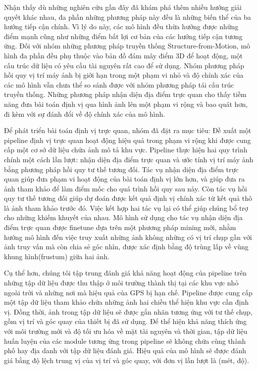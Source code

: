 Nhận thấy dù những nghiên cứu gần đây đã khám phá thêm nhiều hướng giải quyết khác nhau, đa phần những phương pháp này đều là những biến thể của ba hướng tiếp cận chính. Vì lý do này, các mô hình đều thừa hưởng được những điểm mạnh cũng như những điểm bất lợi cơ bản của các hướng tiếp cận tương ứng. Đối với nhóm những phương pháp truyền thống Structure-from-Motion, mô hình đa phần đều phụ thuộc vào bản đồ đám mây điểm 3D để hoạt động, một cấu trúc dữ liệu có yêu cầu tài nguyên rất cao để sử dụng. Nhóm phương pháp hồi quy vị trí máy ảnh bị giới hạn trong một phạm vi nhỏ và độ chính xác của các mô hình vẫn chưa thể so sánh được với nhóm phương pháp tái cấu trúc truyền thống. Những phương pháp nhận diện địa điểm trực quan cho thấy tiềm năng đưa bài toán định vị qua hình ảnh lên một phạm vi rộng và bao quát hơn, đi kèm với sự đánh đổi về độ chính xác của mô hình.

Để phát triển bài toán định vị trực quan, nhóm đã đặt ra mục tiêu: Đề xuất một pipeline định vị trực quan hoạt động hiệu quả trong phạm vi rộng khi được cung cấp một cơ sở dữ liệu chứa ảnh mô tả khu vực. Pipeline thực hiện hai quy trình chính một cách lần lượt: nhận diện địa điểm trực quan và ước tính vị trí máy ảnh bằng phương pháp hồi quy tư thế tương đối. Tác vụ nhận diện địa điểm trực quan giúp đưa phạm vi hoạt động của bài toán định vị lớn hơn, và giúp đưa ra ảnh tham khảo để làm điểm mốc cho quá trình hồi quy sau này. Còn tác vụ hồi quy tư thế tương đối giúp dự đoán được kết quả định vị chính xác từ kết quả thô là ảnh tham khảo trước đó. Việc kết hợp hai tác vụ lại có thể giúp chúng bổ trợ cho những khiếm khuyết của nhau. Mô hình sử dụng cho tác vụ nhận diện địa điểm trực quan được finetune dựa trên một phương pháp mining mới, nhằm hướng mô hình đến việc truy xuất những ảnh không những có vị trí chụp gần với ảnh truy vấn mà còn chia sẻ góc nhìn, được xác định bằng độ trùng lấp về vùng khung hình(frustum) giữa hai ảnh.

Cụ thể hơn, chúng tôi tập trung đánh giá khả năng hoạt động của pipeline trên những tập dữ liệu được thu thập ở môi trường thành thị tại các khu vực nhỏ ngoài trời và những nơi mà hiệu quả của GPS bị hạn chế. Pipeline được cung cấp một tập dữ liệu tham khảo chứa những ảnh hai chiều thể hiện khu vực cần định vị. Đồng thời, ảnh trong tập dữ liệu sẽ được gắn nhãn tương ứng với tư thế chụp, gồm vị trí và góc quay của thiết bị đã sử dụng. Để thể hiện khả năng thích ứng với môi trường mới và độ tối ưu hóa về mặt tài nguyên và thời gian, tập dữ liệu huấn luyện của các module tương ứng trong pipeline sẽ không chứa cùng thành phố hay địa danh với tập dữ liệu đánh giá. Hiệu quả của mô hình sẽ được đánh giá bằng độ lệch trung vị của vị trí và góc quay, với đơn vị lần lượt là (mét, độ).


